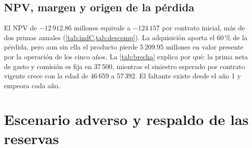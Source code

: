 \documentclass[10pt,a4paper]{article}
\numberwithin{equation}{section}
\newcommand{\tabla}[1]{}
\newcommand{\um}{u.m.}
\begin{document}
	\begin{table}[htbp]
		\centering\small
		\setlength{\tabcolsep}{4pt}
		\tabla{C_recursos_base}
		\caption{Recursos y aportes del caso base, en millones de \um\ El saldo antes de aporte es \(\widetilde F_t\) y la reserva es \(V_t\) al cierre.}\label{tab:recursos}
	\end{table}

	\subsection{NPV, margen y origen de la pérdida}

	El NPV de \(-12\,912.86\) millones equivale a \(-124\,157\) por contrato inicial, más de dos primas anuales (\cref{tab:indC,tab:descomp}). La adquisición aporta el 60\,\% de la pérdida, pero aun sin ella el producto pierde 5\,209.95 millones en valor presente por la operación de los cinco años. La \cref{tab:brecha} explica por qué: la prima neta de gasto y comisión es fija en 37\,500, mientras el siniestro esperado por contrato vigente crece con la edad de 46\,659 a 57\,392. El faltante existe desde el año 1 y empeora cada año.

	\begin{table}[htbp]
		\centering\small
		\setlength{\tabcolsep}{4pt}
		\begin{minipage}[t]{0.40\textwidth}
			\vspace{0pt}\centering
			\tabla{C_indicadores_base}
			\label{tab:indC}
		\end{minipage}\hfill
		\begin{minipage}[t]{0.57\textwidth}
			\vspace{0pt}\centering
			\tabla{C_descomposicion_NPV}
			\label{tab:descomp}
		\end{minipage}
	\end{table}

	\begin{table}[H]
		\centering\small
		\tabla{C_brecha_por_contrato}
		\caption{Siniestro esperado frente a prima neta de gasto y comisión, por contrato vigente al inicio del año, en \um}\label{tab:brecha}
	\end{table}

	\section{Escenario adverso y respaldo de las reservas}\label{sec:D}
\end{document}
